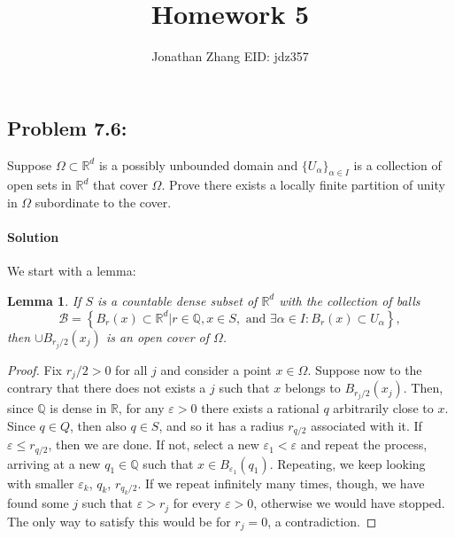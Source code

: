 \documentclass[letterpaper,twoside,11pt]{article}
\theoremstyle{mystyle}
\newtheorem{lemma}[theorem]{Lemma}
\newcommand{\R}{{\mathbb R}}
\newcommand{\Q}{{\mathbb Q}}
\begin{document}
\title{\vspace{-2\baselineskip} 
Homework 5
}
\author{Jonathan Zhang \qquad EID: { jdz357} }
\date{}
\maketitle


\subsection*{Problem 7.6:}
Suppose $\Omega \subset \R^d$ is a possibly unbounded domain and $\{U_\alpha\}_{\alpha \in I}$ is a collection of open sets in $\R^d$ that cover $\Omega$. Prove there exists a locally finite partition of unity in $\Omega$ subordinate to the cover. 

\paragraph*{Solution} We start with a lemma: 
\begin{lemma}
  If $S$ is a countable dense subset of $\R^d$ with the collection of balls 
  \[\mathcal B = \left\{ B_r(x) \subset \R^d | r \in \mathbb{Q}, x\in S, \text{ and } \exists \alpha \in I : B_r(x) \subset U_\alpha \right\},\]
  then $\cup B_{r_j/2}(x_j)$ is an open cover of $\Omega$. 

\end{lemma}
\begin{proof}
  Fix $r_j/2 >0$ for all $j$ and consider a point $x\in \Omega$. Suppose now to the contrary that there does not exists a $j$ such that $x$ belongs to $B_{r_j/2}(x_j)$. Then, since $\Q$ is dense in $\R$, for any $\varepsilon>0$ there exists a rational $q$ arbitrarily close to $x$. Since $q\in Q$, then also $q\in S$, and so it has a radius $r_{q/2}$ associated with it. If $\varepsilon \leq r_{q/2}$, then we are done. If not, select a new $\varepsilon_1 < \varepsilon$ and repeat the process, arriving at a new $q_1\in \Q$ such that $x\in B_{\varepsilon_1}(q_1)$. Repeating, we keep looking with smaller $\varepsilon_k$, $q_k$, $r_{q_k/2}$. If we repeat infinitely many times, though, we have found some $j$ such that $\varepsilon > r_j$ for every $\varepsilon >0$, otherwise we would have stopped. The only way to satisfy this would be for $r_j = 0$, a contradiction. 
\end{proof}
\end{document}

